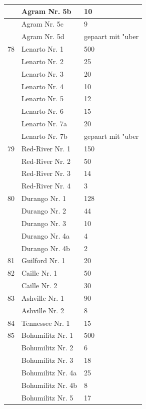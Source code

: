 \documentclass[a4paper, 11pt, oneside, polutonikogreek, german]{article}
\begin{document}
\begin{center}
\begin{longtable}{|l|l|l|}
          & Agram Nr. 5b & 10 \\ \hline
          & Agram Nr. 5c & 9 \\ \hline
          & Agram Nr. 5d & gepaart mit "uber \\ \hline
        78 & Lenarto Nr. 1 & 500 \\ \hline
          & Lenarto Nr. 2 & 25 \\ \hline
          & Lenarto Nr. 3 & 20 \\ \hline
          & Lenarto Nr. 4 & 10 \\ \hline
          & Lenarto Nr. 5 & 12 \\ \hline
          & Lenarto Nr. 6 & 15 \\ \hline
          & Lenarto Nr. 7a & 20 \\ \hline
          & Lenarto Nr. 7b & gepaart mit "uber \\ \hline
        79 & Red-River Nr. 1 & 150 \\ \hline
          & Red-River Nr. 2 & 50 \\ \hline
          & Red-River Nr. 3 & 14 \\ \hline
          & Red-River Nr. 4 & 3 \\ \hline
        80 & Durango Nr. 1 & 128 \\ \hline
          & Durango Nr. 2 & 44 \\ \hline
          & Durango Nr. 3 & 10 \\ \hline
          & Durango Nr. 4a & 4 \\ \hline
          & Durango Nr. 4b & 2 \\ \hline
        81 & Guilford Nr. 1 & 20 \\ \hline
        82 & Caille Nr. 1 & 50 \\ \hline
          & Caille Nr. 2 & 30 \\ \hline
        83 & Ashville Nr. 1 & 90 \\ \hline
          & Ashville Nr. 2 & 8 \\ \hline
        84 & Tennessee Nr. 1 & 15 \\ \hline
        85 & Bohumilitz Nr. 1 & 500 \\ \hline
          & Bohumilitz Nr. 2 & 6 \\ \hline
          & Bohumilitz Nr. 3 & 18 \\ \hline
          & Bohumilitz Nr. 4a & 25 \\ \hline
          & Bohumilitz Nr. 4b & 8 \\ \hline
          & Bohumilitz Nr. 5 & 17 \\ \hline

\end{longtable}
\end{center}
\end{document}

